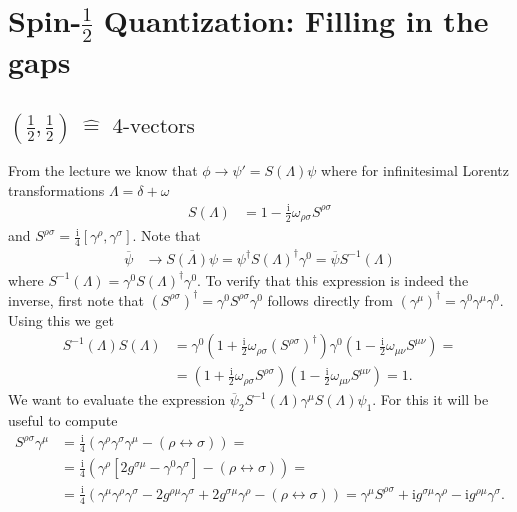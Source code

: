 \documentclass[english, parskip=full]{scrartcl}
\title{\titel}
\author{\autor}
\date{\today}
\newcommand{\kla}{}
\newcommand{\klam}{}
\renewcommand{\i}{\text{i}}
\begin{document}
\maketitle  %

\section{Spin-$\frac{1}{2}$ Quantization: Filling in the gaps}
\subsection{$(\frac{1}{2},\frac{1}{2}) \ \hat{=} \text{ 4-vectors}$}
From the lecture we know that $\phi \rightarrow \psi' = S(\Lambda)\psi$ where for infinitesimal Lorentz transformations $\Lambda = \delta + \omega$ 
\begin{align}
S(\Lambda) &= 1 - \frac{\i}{2} \omega_{\rho\sigma}S^{\rho\sigma}
\end{align}
and $S^{\rho\sigma} = \frac{\i}{4} \klam\left[ \gamma^\rho, \gamma^\sigma \right]$.
Note that
\begin{align}
\overline{\psi} &\longrightarrow \overline{S(\Lambda) \psi} = \psi^\dagger S(\Lambda)^\dagger \gamma^0 = \overline{\psi} S^{-1}(\Lambda)
\end{align}
where $S^{-1}(\Lambda) = \gamma^0 S(\Lambda)^\dagger \gamma^0$.
To verify that this expression is indeed the inverse, first note that $(S^{\rho\sigma})^\dagger = \gamma^0 S^{\rho \sigma} \gamma^0$ follows directly from $(\gamma^\mu)^\dagger = \gamma^0 \gamma^\mu \gamma^0$.
Using this we get
\begin{align}
S^{-1}(\Lambda) S(\Lambda) &= \gamma^0 \kla\left( 1 + \frac{\i}{2} \omega_{\rho\sigma} (S^{\rho\sigma})^\dagger \right) \gamma^0 \kla\left( 1 - \frac{\i}{2} \omega_{\mu\nu} S^{\mu\nu} \right) = \\
&= \kla\left( 1 + \frac{\i}{2} \omega_{\rho\sigma} S^{\rho\sigma} \right) \kla\left( 1 - \frac{\i}{2} \omega_{\mu\nu} S^{\mu\nu} \right) = 1.
\end{align}
We want to evaluate the expression $\overline{\psi}_2 S^{-1}(\Lambda) \gamma^\mu S(\Lambda) \psi_1$.
For this it will be useful to compute
\begin{align}
S^{\rho\sigma} \gamma^\mu &= \frac{\i}{4} \kla\left( \gamma^\rho\gamma^\sigma\gamma^\mu - (\rho \leftrightarrow \sigma) \right) = \\
&= \frac{\i}{4}\kla\left( \gamma^\rho \klam\left[ 2g^{\sigma \mu} - \gamma^0\gamma^\sigma \right] - (\rho \leftrightarrow \sigma) \right) = \\
&= \frac{\i}{4} \kla\left( \gamma^\mu\gamma^\rho \gamma^\sigma - 2g^{\rho \mu} \gamma^\sigma + 2g^{\sigma \mu} \gamma^\rho - (\rho \leftrightarrow \sigma) \right) = \gamma^\mu S^{\rho\sigma} + \i g^{\sigma \mu} \gamma^\rho - \i g^{\rho \mu} \gamma^\sigma.
\end{align}
\end{document}
